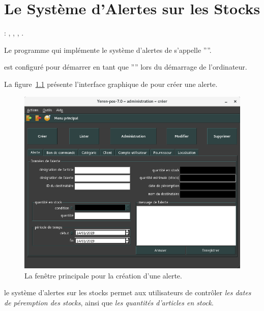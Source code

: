 \chapter{Le Syst\`eme d'Alertes sur les Stocks}\label{chap:systeme-dalertes}

\utilisateurs: \lienadmin, \liencaissier, \lienmagasinier, \lienpatron.\\



Le programme qui impl\'emente le syst\`eme d'alertes
de \yeren s'appelle ''''.

\yerenalert est configur\'e pour d\'emarrer en tant que
'''' lors du
d\'emarrage de l'ordinateur.

La figure~\ref{fig:yeren-fenetre-creer-alerte}
pr\'esente l'interface graphique de \yeren pour
cr\'eer une alerte.

\begin{figure}[!htbp]
	\centering
	\includegraphics[scale=0.63]{images/yeren-fenetre-creer-alerte.png}
	\caption{La fen\^etre principale pour la cr\'eation d'une alerte.}
	\label{fig:yeren-fenetre-creer-alerte}
\end{figure}

le syst\`eme d'alertes sur les stocks permet aux
utilisateurs de contr\^oler \emph{les dates de
p\'eremption des stocks},
ainsi que \emph{les quantit\'es d'articles en stock}.

